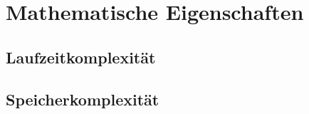 \section{Mathematische Eigenschaften}
	
	\subsection{Laufzeitkomplexität}
		
	\subsection{Speicherkomplexität}
		
